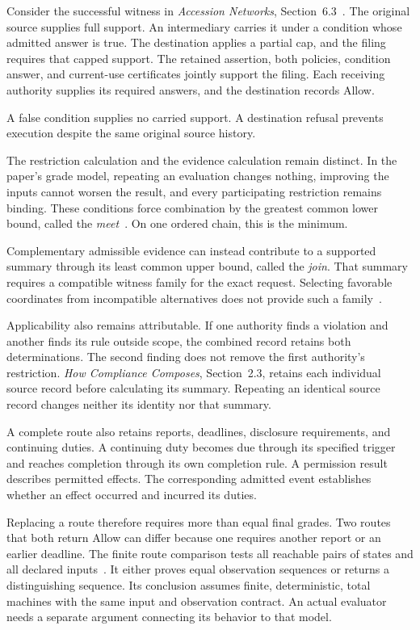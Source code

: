 \documentclass{momentum}
\begin{document}
Consider the successful witness in \emph{Accession Networks}, Section~6.3~\cite{accession}.
The original source supplies full support.
An intermediary carries it under a condition whose admitted answer is true.
The destination applies a partial cap, and the filing requires that capped support.
The retained assertion, both policies, condition answer, and current-use certificates jointly support the filing.
Each receiving authority supplies its required answers, and the destination records Allow.

A false condition supplies no carried support.
A destination refusal prevents execution despite the same original source history.

The restriction calculation and the evidence calculation remain distinct.
In the paper's grade model, repeating an evaluation changes nothing, improving the inputs cannot worsen the result, and every participating restriction remains binding.
These conditions force combination by the greatest common lower bound, called the \emph{meet}~\cite[Section~2.1, Proposition~2.2]{compliance}.
On one ordered chain, this is the minimum.

Complementary admissible evidence can instead contribute to a supported summary through its least common upper bound, called the \emph{join}.
That summary requires a compatible witness family for the exact request.
Selecting favorable coordinates from incompatible alternatives does not provide such a family~\cite[Sections~3.3 and~5.5]{compliance}.

Applicability also remains attributable.
If one authority finds a violation and another finds its rule outside scope, the combined record retains both determinations.
The second finding does not remove the first authority's restriction.
\emph{How Compliance Composes}, Section~2.3, retains each individual source record before calculating its summary.
Repeating an identical source record changes neither its identity nor that summary.

A complete route also retains reports, deadlines, disclosure requirements, and continuing duties.
A continuing duty becomes due through its specified trigger and reaches completion through its own completion rule.
A permission result describes permitted effects.
The corresponding admitted event establishes whether an effect occurred and incurred its duties.

Replacing a route therefore requires more than equal final grades.
Two routes that both return Allow can differ because one requires another report or an earlier deadline.
The finite route comparison tests all reachable pairs of states and all declared inputs~\cite[Section~5.7, Theorem~5.25]{compliance}.
It either proves equal observation sequences or returns a distinguishing sequence.
Its conclusion assumes finite, deterministic, total machines with the same input and observation contract.
An actual evaluator needs a separate argument connecting its behavior to that model.
\end{document}
